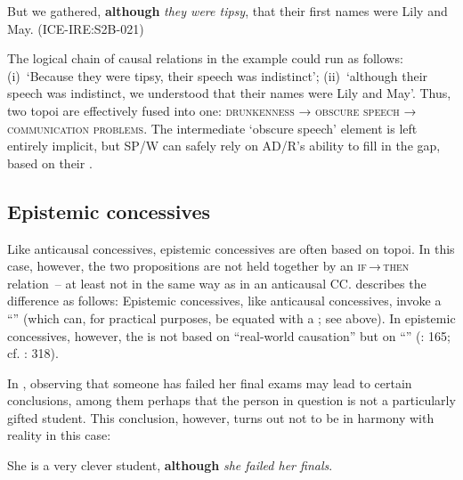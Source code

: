 \ea\label{ex:14}   But we gathered, \textbf{although} \textit{they were tipsy}, that their first names were Lily and May. (ICE-IRE:S2B-021)
\z

The logical chain of causal relations in the example could run as follows:
(i)~‘Because they were tipsy, their speech was indistinct’;
(ii)~‘although their speech was indistinct, we understood that their names were Lily and May’. Thus, two topoi are effectively fused into one: \textsc{drunkenness} → \textsc{obscure} \textsc{speech} → \textsc{communication} \textsc{problems}. The intermediate ‘obscure speech’ element is left entirely implicit, but SP/W can safely rely on AD/R’s ability to fill in the gap, based on their .

\subsection{\label{bkm:Ref479420416}Epistemic concessives}\label{sec:2.2.2}

Like anticausal concessives, epistemic concessives are often based on topoi. In this case, however, the two propositions are not held together by an \textsc{if}\,→\,\textsc{then} relation~– at least not in the same way as in an anticausal CC. \citet[165–167]{Hilpert2013a} describes the difference as follows: Epistemic concessives, like anticausal concessives, invoke a “” (which can, for practical purposes, be equated with a ; see  above). In epistemic concessives, however, the  is not based on “real-world causation” but on “” (\citealt{Hilpert2013a}: 165; cf. \citealt{Crevels2000}: 318).

In , observing that someone has failed her final exams may lead to certain conclusions, among them perhaps that the person in question is not a particularly gifted student. This conclusion, however, turns out not to be in harmony with reality in this case:

\ea\label{ex:15} \label{bkm:Ref488739088}  She is a very clever student, \textbf{although} \textit{she failed her finals}.\\
\z

